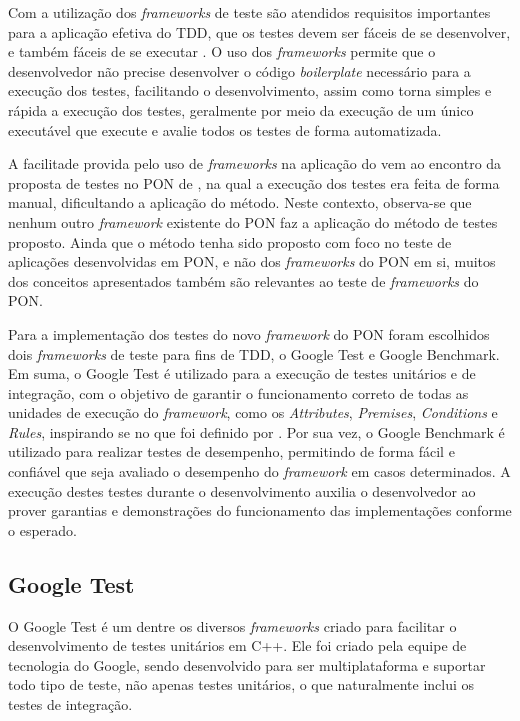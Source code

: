 Com a utilização dos \textit{frameworks} de teste são atendidos requisitos
importantes para a aplicação efetiva do TDD, que os testes devem ser fáceis de
se desenvolver, e também fáceis de se executar \cite{google_test_primer}. O uso
dos \textit{frameworks} permite que o desenvolvedor não precise desenvolver o
código \textit{boilerplate} necessário para a execução dos testes, facilitando o
desenvolvimento, assim como torna simples e rápida a execução dos testes,
geralmente por meio da execução de um único executável que execute e avalie
todos os testes de forma automatizada. 

A facilitade provida pelo uso de \textit{frameworks} na aplicação do vem ao
encontro da proposta de testes no PON de , na qual
a execução dos testes era feita de forma manual, dificultando a aplicação do
método. Neste contexto, observa-se que nenhum outro \textit{framework} existente
do PON faz a aplicação do método de testes proposto. Ainda que o método tenha
sido proposto com foco no teste de aplicações desenvolvidas em PON, e não dos
\textit{frameworks} do PON em si, muitos dos conceitos apresentados também são
relevantes ao teste de \textit{frameworks} do PON.

Para a implementação dos testes do novo \textit{framework} do PON foram
escolhidos dois \textit{frameworks} de teste para fins de TDD, o Google Test e
Google Benchmark. Em suma, o Google Test é utilizado para a execução de testes
unitários e de integração, com o objetivo de garantir o funcionamento correto de
todas as unidades de execução do \textit{framework}, como os
\textit{Attributes}, \textit{Premises}, \textit{Conditions} e \textit{Rules},
inspirando se no que foi definido por . Por sua
vez, o Google Benchmark é utilizado para realizar testes de desempenho,
permitindo de forma fácil e confiável que seja avaliado o desempenho do
\textit{framework} em casos determinados. A execução destes testes durante o
desenvolvimento auxilia o desenvolvedor ao prover garantias e demonstrações do
funcionamento das implementações conforme o esperado.

\subsection{Google Test}

O Google Test é um dentre os diversos \textit{frameworks} criado para facilitar
o desenvolvimento de testes unitários em C++. Ele foi criado pela equipe de
tecnologia do Google, sendo desenvolvido para ser multiplataforma e suportar
todo tipo de teste, não apenas testes unitários, o que naturalmente inclui os
testes de integração.

